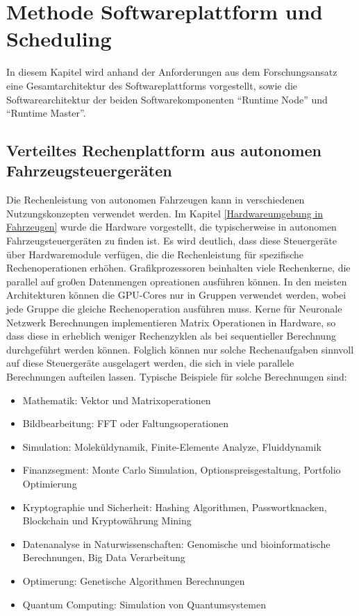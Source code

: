\chapter{Methode Softwareplattform und Scheduling}
\label{Methode Softwareplattform und Scheduling}

In diesem Kapitel wird anhand der Anforderungen aus dem Forschungsansatz eine Gesamtarchitektur des Softwareplattforms vorgestellt, sowie die Softwarearchitektur der beiden Softwarekomponenten \enquote{Runtime Node} und \enquote{Runtime Master}. 

\section{Verteiltes Rechenplattform aus autonomen Fahrzeugsteuergeräten}

Die Rechenleistung von autonomen Fahrzeugen kann in verschiedenen Nutzungskonzepten verwendet werden. Im Kapitel \autoref{Hardwareumgebung in Fahrzeugen} wurde die Hardware vorgestellt, die typischerweise in autonomen Fahrzeugsteuergeräten zu finden ist. Es wird deutlich, dass diese Steuergeräte über Hardwaremodule verfügen, die die Rechenleistung für spezifische Rechenoperationen erhöhen. Grafikprozessoren beinhalten viele Rechenkerne, die parallel auf gro0en Datenmengen opreationen ausführen können. In den meisten Architekturen können die GPU-Cores nur in Gruppen verwendet werden, wobei jede Gruppe die gleiche Rechenoperation ausführen muss. Kerne für Neuronale Netzwerk Berechnungen implementieren Matrix Operationen in Hardware, so dass diese in erheblich weniger Rechenzyklen als bei sequentieller Berechnung durchgeführt werden können. Folglich können nur solche Rechenaufgaben sinnvoll auf diese Steuergeräte ausgelagert werden, die sich in viele parallele Berechnungen aufteilen lassen. Typische Beispiele für solche Berechnungen sind:

\begin{itemize}
    \item Mathematik: Vektor und Matrixoperationen
    \item Bildbearbeitung: FFT oder Faltungsoperationen
    \item Simulation: Moleküldynamik, Finite-Elemente Analyze, Fluiddynamik
    \item Finanzsegment: Monte Carlo Simulation, Optionspreisgestaltung, Portfolio Optimierung
    \item Kryptographie und Sicherheit: Hashing Algorithmen, Passwortknacken, Blockchain und Kryptowährung Mining
    \item Datenanalyse in Naturwissenschaften: Genomische und bioinformatische Berechnungen, Big Data Verarbeitung
    \item Optimerung: Genetische Algorithmen Berechnungen
    \item Quantum Computing: Simulation von Quantumsystemen
\end{itemize}

